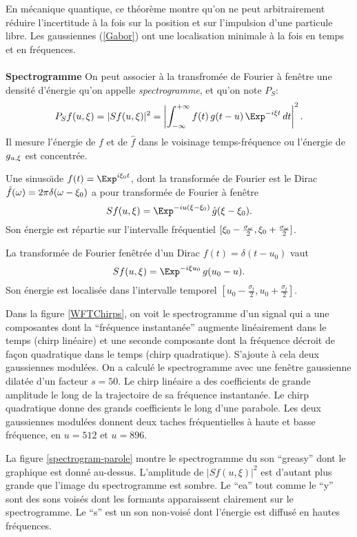 En m\'{e}canique quantique, ce th\'{e}or\`{e}me montre qu'on ne peut 
arbitrairement r\'{e}duire l'incertitude \`{a} la fois sur la position 
et sur l'impulsion d'une particule libre. Les gaussiennes 
(\ref{Gabor}) ont une localisation minimale \`{a} la fois en 
temps et en fr\'{e}quences.
\\
\\
{\bf Spectrogramme}
On peut associer \`a la transfrom\'ee de Fourier \`a fen\^etre
une densit\'{e} 
d'\'{e}nergie qu'on appelle {\it spectrogramme}, et qu'on note $P_S$:
\begin{equation}
\label{SpectroDef}
P_S f (u,\xi) = |Sf(u,\xi)|^2 
= \left|\int_{- \infty}^{+ \infty} f(t)\, g(t-u)\, \Exp^{- i \xi t} \,dt 
\right|^2 .
\end{equation}
Il mesure l'\'{e}nergie de $f$ et de $\hat f$ dans le voisinage 
temps-fr\'{e}quence ou l'\'energie de $g_{u,\xi}$ est concentr\'ee.

\begin{Examples} 
\item 
Une sinuso\"{\i}de $f(t)=	\Exp^{i	\xi_0 t}$, dont la transform\'{e}e 
de Fourier est le Dirac $\hat f({\omega}) = 2 \pi \delta	({\omega} - \xi_0)$ a 
pour transform\'{e}e de Fourier \`a fen\^{e}tr{e}
\[
Sf(u,\xi) = \Exp^{-iu(\xi - \xi_0)} \, \hat g(\xi - \xi_0). 
\]
Son \'{e}nergie est r\'{e}partie sur l'intervalle fr\'{e}quentiel
$[\xi_0 - \frac {\sigma_{\omega}} 2 , \xi_0 + \frac {\sigma_{\omega}} 2 ]$.

\item 
La transform\'{e}e de Fourier fen\^{e}tr\'{e}e d'un Dirac
$f(t) = \delta	(t - u_0)$ vaut
\[
Sf(u,\xi) = \Exp^{-i \xi u_0} \,g(u_0 - u) .
\]
Son \'{e}nergie est localis\'{e}e dans l'intervalle temporel
$[u_0 - \frac {\sigma_t} 2 , u_0 + \frac {\sigma_t} 2 ]$.

\item 
Dans la figure \ref{WFTChirps}, on voit le spectrogramme 
d'un signal qui a une composantes dont la ``fr\'equence
instantan\'ee''
augmente lin\'eairement dans le temps (chirp lin\'eaire)
et une seconde composante
dont la fr\'equence d\'ecroit de fa\c{c}on quadratique 
dans le temps (chirp quadratique). S'ajoute \`a cela 
deux gaussiennes modul\'{e}es. 
On a calcul\'{e} le spectrogramme avec une 
fen\^{e}tre gaussienne dilat\'{e}e d'un facteur $s = 50$. 
Le chirp lin\'{e}aire a des coefficients de grande amplitude 
le long de la trajectoire de sa fr\'{e}quence instantan\'ee.
Le chirp quadratique donne des grands coefficients le long 
d'une parabole. Les deux gaussiennes modul\'{e}es donnent deux taches 
fr\'{e}quentielles \`{a} haute et basse fr\'{e}quence, en
 $u =	512$ et $u	= 896$.

\item La figure \ref{spectrogram-parole} 
montre le spectrogramme du son ``greasy'' dont le graphique
est donn\'e au-dessus. L'amplitude de $|Sf(u,\xi)|^2$ est
d'autant plus grande que l'image du spectrogramme est sombre.
Le ``ea'' tout comme le ``y'' sont
des sons vois\'es dont les formants apparaissent clairement sur
le spectrogramme. Le ``s'' est un son non-vois\'e dont l'\'energie
est diffus\'e en hautes fr\'equences.
\end{Examples}

